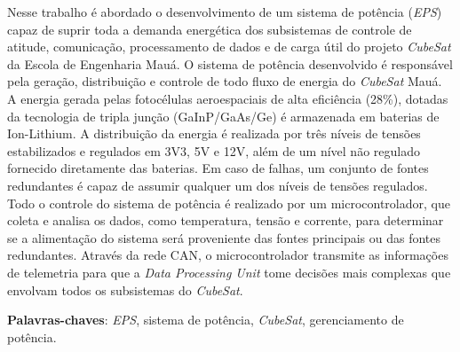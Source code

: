 \documentclass[
	12pt,				%
	openright,			%
	oneside,			%
	a4paper,			%
	english,			%
	french,				%
	spanish,			%
	brazil,				%
	oldfontcommands
	]{abntex2}
\begin{document}
\setlength{\absparsep}{18pt} %
\begin{resumo}
 
	Nesse trabalho é abordado o desenvolvimento de um sistema de potência (\textit{EPS}) capaz de suprir toda a demanda energética dos subsistemas de controle de atitude, comunicação, processamento de dados e de carga útil do projeto \textit{CubeSat} da Escola de Engenharia Mauá. O sistema de potência desenvolvido é responsável pela geração, distribuição e controle de todo fluxo de energia do \textit{CubeSat} Mauá. A energia gerada pelas fotocélulas aeroespaciais de alta eficiência (28\%), dotadas da tecnologia de tripla junção (GaInP/GaAs/Ge) é armazenada em baterias de Ion-Lithium. A distribuição da energia é realizada por três níveis de tensões estabilizados e regulados em 3V3, 5V e 12V, além de um nível não regulado fornecido diretamente das baterias. Em caso de falhas, um conjunto de fontes redundantes é capaz de assumir qualquer um dos níveis de tensões regulados. Todo o controle do sistema de potência é realizado por um microcontrolador, que coleta e analisa os dados, como temperatura, tensão e corrente, para determinar se a alimentação do sistema será proveniente das fontes principais ou das fontes redundantes. Através da rede CAN, o microcontrolador transmite as informações de telemetria para que a \textit{Data Processing Unit} tome decisões mais complexas que envolvam todos os subsistemas do \textit{CubeSat}.
	
	\vspace{\onelineskip}

 \noindent 
 \textbf{Palavras-chaves}: \textit{EPS}, sistema de potência, \textit{CubeSat}, gerenciamento de potência.
\end{resumo}
\end{document}
